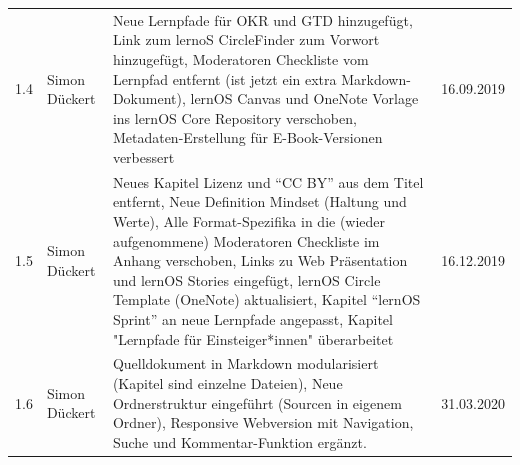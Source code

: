 \documentclass[
  ngerman,
  paper=a4,
,captions=tableheading
]{scrartcl}
\begin{document}
\begin{longtable}[]{@{}llll@{}}
\begin{minipage}[t]{0.06\columnwidth}
1.4\strut
\end{minipage} & \begin{minipage}[t]{0.19\columnwidth}\raggedright
Simon Dückert\strut
\end{minipage} & \begin{minipage}[t]{0.53\columnwidth}\raggedright
Neue Lernpfade für OKR und GTD hinzugefügt, Link zum lernoS CircleFinder
zum Vorwort hinzugefügt, Moderatoren Checkliste vom Lernpfad entfernt
(ist jetzt ein extra Markdown-Dokument), lernOS Canvas und OneNote
Vorlage ins lernOS Core Repository verschoben, Metadaten-Erstellung für
E-Book-Versionen verbessert\strut
\end{minipage} & \begin{minipage}[t]{0.11\columnwidth}\raggedright
16.09.2019\strut
\end{minipage}\tabularnewline
\begin{minipage}[t]{0.06\columnwidth}\raggedright
1.5\strut
\end{minipage} & \begin{minipage}[t]{0.19\columnwidth}\raggedright
Simon Dückert\strut
\end{minipage} & \begin{minipage}[t]{0.53\columnwidth}\raggedright
Neues Kapitel Lizenz und ``CC BY'' aus dem Titel entfernt, Neue
Definition Mindset (Haltung und Werte), Alle Format-Spezifika in die
(wieder aufgenommene) Moderatoren Checkliste im Anhang verschoben, Links
zu Web Präsentation und lernOS Stories eingefügt, lernOS Circle Template
(OneNote) aktualisiert, Kapitel ``lernOS Sprint'' an neue Lernpfade
angepasst, Kapitel "Lernpfade für Einsteiger*innen" überarbeitet\strut
\end{minipage} & \begin{minipage}[t]{0.11\columnwidth}\raggedright
16.12.2019\strut
\end{minipage}\tabularnewline
\begin{minipage}[t]{0.06\columnwidth}\raggedright
1.6\strut
\end{minipage} & \begin{minipage}[t]{0.19\columnwidth}\raggedright
Simon Dückert\strut
\end{minipage} & \begin{minipage}[t]{0.53\columnwidth}\raggedright
Quelldokument in Markdown modularisiert (Kapitel sind einzelne Dateien),
Neue Ordnerstruktur eingeführt (Sourcen in eigenem Ordner), Responsive
Webversion mit Navigation, Suche und Kommentar-Funktion ergänzt.\strut
\end{minipage} & \begin{minipage}[t]{0.11\columnwidth}\raggedright
31.03.2020\strut
\end{minipage}\tabularnewline
\bottomrule
\end{longtable}
\end{document}
